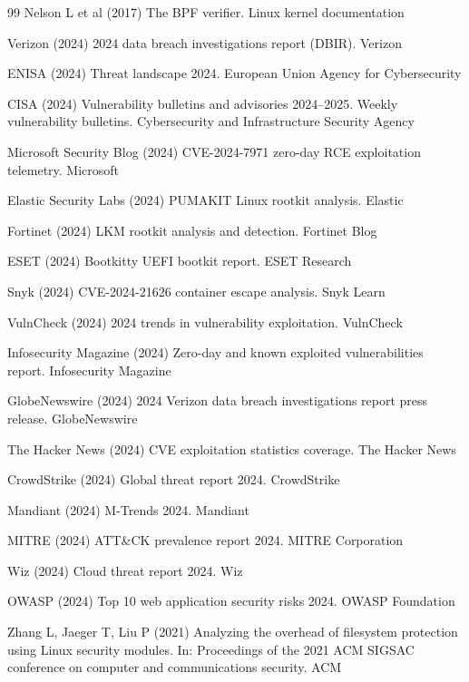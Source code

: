 \documentclass[]{sn-jnl}
\begin{document}
\begin{thebibliography}{99}
Nelson L et al (2017) The BPF verifier. Linux kernel documentation

Verizon (2024) 2024 data breach investigations report (DBIR). Verizon

ENISA (2024) Threat landscape 2024. European Union Agency for Cybersecurity

CISA (2024) Vulnerability bulletins and advisories 2024--2025. Weekly vulnerability
bulletins. Cybersecurity and Infrastructure Security Agency

Microsoft Security Blog (2024) CVE-2024-7971 zero-day RCE exploitation telemetry.
Microsoft

Elastic Security Labs (2024) PUMAKIT Linux rootkit analysis. Elastic

Fortinet (2024) LKM rootkit analysis and detection. Fortinet Blog

ESET (2024) Bootkitty UEFI bootkit report. ESET Research

Snyk (2024) CVE-2024-21626 container escape analysis. Snyk Learn

VulnCheck (2024) 2024 trends in vulnerability exploitation. VulnCheck

Infosecurity Magazine (2024) Zero-day and known exploited vulnerabilities report.
Infosecurity Magazine

GlobeNewswire (2024) 2024 Verizon data breach investigations report press release.
GlobeNewswire

The Hacker News (2024) CVE exploitation statistics coverage. The Hacker News

CrowdStrike (2024) Global threat report 2024. CrowdStrike

Mandiant (2024) M-Trends 2024. Mandiant

MITRE (2024) ATT\&CK prevalence report 2024. MITRE Corporation

Wiz (2024) Cloud threat report 2024. Wiz

OWASP (2024) Top 10 web application security risks 2024. OWASP Foundation

Zhang L, Jaeger T, Liu P (2021) Analyzing the overhead of filesystem protection
using Linux security modules. In: Proceedings of the 2021 ACM SIGSAC conference
on computer and communications security. ACM


\end{thebibliography}
\end{document}
